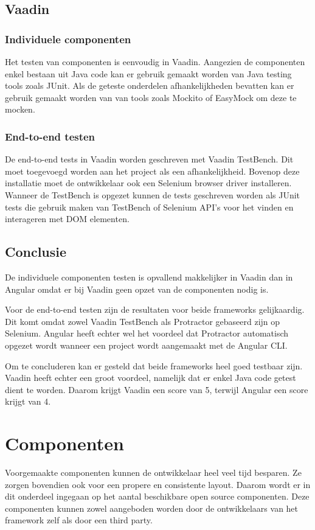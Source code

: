 \subsection{Vaadin}
\subsubsection{Individuele componenten}
Het testen van componenten is eenvoudig in Vaadin. Aangezien de componenten enkel bestaan uit Java code kan er gebruik gemaakt worden van Java testing tools zoals JUnit. Als de geteste onderdelen afhankelijkheden bevatten kan er gebruik gemaakt worden van van tools zoals Mockito of EasyMock om deze te mocken. 

\subsubsection{End-to-end testen}
De end-to-end tests in Vaadin worden geschreven met Vaadin TestBench. Dit moet toegevoegd worden aan het project als een afhankelijkheid. Bovenop deze installatie moet de ontwikkelaar ook een Selenium browser driver installeren. 
Wanneer de TestBench is opgezet kunnen de tests geschreven worden als JUnit tests die gebruik maken van TestBench of Selenium API's voor het vinden en interageren met DOM elementen. 

\subsection{Conclusie}
De individuele componenten testen is opvallend makkelijker in Vaadin dan in Angular omdat er bij Vaadin geen opzet van de componenten nodig is. 

Voor de end-to-end testen zijn de resultaten voor beide frameworks gelijkaardig. Dit komt omdat zowel Vaadin TestBench als Protractor gebaseerd zijn op Selenium. 
Angular heeft echter wel het voordeel dat Protractor automatisch opgezet wordt wanneer een project wordt aangemaakt met de Angular CLI.

Om te concluderen kan er gesteld dat beide frameworks heel goed testbaar zijn. Vaadin heeft echter een groot voordeel, namelijk dat er enkel Java code getest dient te worden. Daarom krijgt Vaadin een score van 5, terwijl Angular een score krijgt van 4. 

\section{ Componenten}
Voorgemaakte componenten kunnen de ontwikkelaar heel veel tijd besparen. Ze zorgen bovendien ook voor een propere en consistente layout. Daarom wordt er in dit onderdeel ingegaan op het aantal beschikbare open source componenten. Deze componenten kunnen zowel aangeboden worden door de ontwikkelaars van het framework zelf als door een third party.

